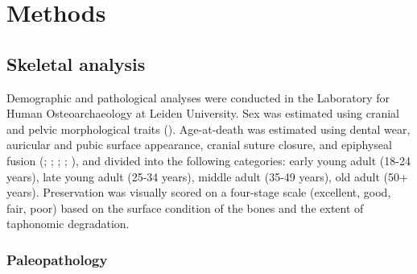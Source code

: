 \documentclass[
  b5paper,
]{book}
\begin{document}
\section{Methods}\label{methods}

\subsection{Skeletal analysis}\label{skeletal-analysis}

Demographic and pathological analyses were conducted in the Laboratory
for Human Osteoarchaeology at Leiden University. Sex was estimated using
cranial and pelvic morphological traits
(). Age-at-death
was estimated using dental wear, auricular and pubic surface appearance,
cranial suture closure, and epiphyseal fusion
(;
;
;
;
), and
divided into the following categories: early young adult (18-24 years),
late young adult (25-34 years), middle adult (35-49 years), old adult
(50+ years). Preservation was visually scored on a four-stage scale
(excellent, good, fair, poor) based on the surface condition of the
bones and the extent of taphonomic degradation.

\subsubsection{Paleopathology}\label{paleopathology}
\end{document}

